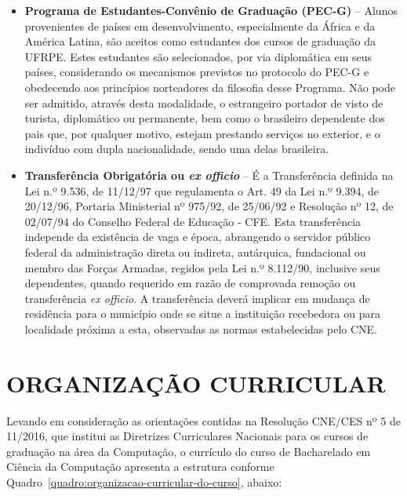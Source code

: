 \documentclass[
	12pt,				%
	openright,			%
  oneside,     %
	a4paper,			%
	chapter=TITLE,		%
	english,			%
	french,				%
	spanish,			%
	brazil				%
	]{abntex2}
\begin{document}
\begin{itemize}
    \item \textbf{Programa de Estudantes-Convênio de Graduação (PEC-G)} – Alunos provenientes de países em desenvolvimento, especialmente da África e da América Latina, são aceitos como estudantes dos cursos de graduação da UFRPE. Estes estudantes são selecionados, por via diplomática em seus países, considerando os mecanismos previstos no protocolo do PEC-G e obedecendo aos princípios norteadores da filosofia desse Programa. Não pode ser admitido, através desta modalidade, o estrangeiro portador de visto de turista, diplomático ou permanente, bem como o brasileiro dependente dos pais que, por qualquer motivo, estejam prestando serviços no exterior, e o indivíduo com dupla nacionalidade, sendo uma delas brasileira.
    \item {\bfseries Transferência Obrigatória ou \textit {ex officio}} – É a Transferência definida na Lei n.º 9.536, de 11/12/97 que regulamenta o Art. 49 da Lei n.º 9.394, de 20/12/96, Portaria Ministerial nº 975/92, de 25/06/92 e Resolução nº 12, de 02/07/94 do Conselho Federal de Educação - CFE. Esta transferência independe da existência de vaga e época, abrangendo o servidor público federal da administração direta ou indireta, autárquica, fundacional ou membro das Forças Armadas, regidos pela Lei n.º 8.112/90, inclusive seus dependentes, quando requerido em razão de comprovada remoção ou transferência \textit {ex officio}. A transferência deverá implicar em mudança de residência para o município onde se situe a instituição recebedora ou para localidade próxima a esta, observadas as normas estabelecidas pelo CNE.
\end{itemize}





%
%


\chapter{ORGANIZAÇÃO CURRICULAR}

Levando em consideração as orientações contidas na Resolução CNE/CES nº 5 de 11/2016, que institui as Diretrizes Curriculares Nacionais para os cursos de graduação na área da Computação, o currículo do curso de Bacharelado em Ciência da Computação apresenta a  estrutura conforme Quadro~\ref{quadro:organizacao-curricular-do-curso}, abaixo:
\end{document}
